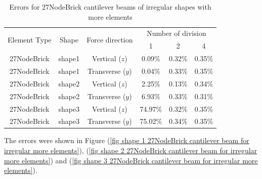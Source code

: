 \documentclass[fleqn,11pt,letter]{article}
\begin{document}
\begin{table}[H]
  \centering
  \caption{Errors for 27NodeBrick cantilever beams of irregular shapes with more elements}
  \label{table Errors for 27NodeBrick cantilever beams of irregular shapes with more elements}
\begin{tabular}{|c|c|c|c|c|c|}
\hline
\multirow{2}{*}{Element Type} & \multirow{2}{*}{Shape}  & \multirow{2}{*}{Force direction}  & \multicolumn{3}{|c|}{Number of division} \\  \cline{4-6}
                        &        &                  &  1 &  2 &  4  \\ \hline
27NodeBrick   & shape1      & Vertical ($z$)   & 0.09\%  & 0.32\% & 0.35\%    \\ \hline
27NodeBrick   & shape1      & Transverse ($y$) & 0.04\%  & 0.33\% & 0.35\%    \\ \hline
27NodeBrick   & shape2      & Vertical ($z$)   & 2.25\%  & 0.13\% & 0.34\%    \\ \hline
27NodeBrick   & shape2      & Transverse ($y$) & 6.93\%  & 0.33\% & 0.31\%    \\ \hline
27NodeBrick   & shape3      & Vertical ($z$)   & 74.97\% & 0.32\% & 0.35\%    \\ \hline
27NodeBrick   & shape3      & Transverse ($y$) & 75.02\% & 0.34\% & 0.35\%    \\
\hline
\end{tabular}
\end{table}


The errors were shown in Figure (\ref{fig shape 1 27NodeBrick cantilever beam for irregular more elements}), (\ref{fig shape 2 27NodeBrick cantilever beam for irregular more elements}) and (\ref{fig shape 3 27NodeBrick cantilever beam for irregular more elements}). 
\end{document}
